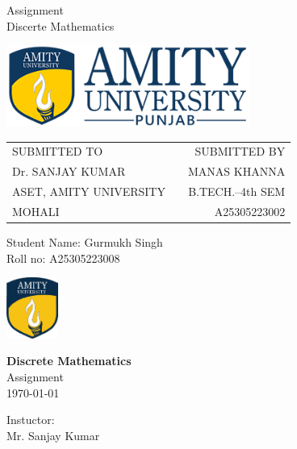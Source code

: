 \documentclass[11pt,letterpaper]{article}
\begin{document}
\pagestyle{plain}

\begin{center}
  \Huge{Assignment \\ Discerte Mathematics}
\end{center}
\vspace{1in}
\begin{center}
\includegraphics[width=0.6\textwidth]{images.png}
\end{center}
\vspace{30px}
\begin{center}
\begin{tabular}{llr}
SUBMITTED TO           &  & SUBMITTED BY       \\
Dr. SANJAY KUMAR       &  & MANAS KHANNA \\
ASET, AMITY UNIVERSITY &  & B.TECH.–4th SEM    \\
MOHALI                 &  & A25305223002     
\end{tabular}
\end{center}

\pagebreak
{}

\begin{flushleft}
Student Name: Gurmukh Singh\\
Roll no: A25305223008
\end{flushleft}

\begin{flushright}\vspace{-15mm}
 \includegraphics[height=2cm]{Amity.png}
\end{flushright}

\begin{center}\vspace{-1cm}
\textbf{\large{Discrete Mathematics}}\\
Assignment\\
\today
\end{center}

\begin{flushright}
Instuctor:\\
Mr. Sanjay Kumar
\end{flushright}
\end{document}
